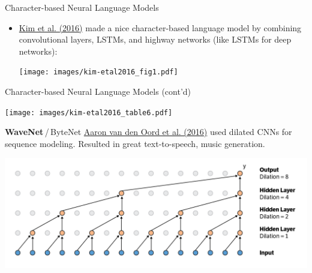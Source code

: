 \documentclass[xcolor=pdftex,x11names,table,hyperref]{beamer}
\newcommand{\conv}{convolutional}
\begin{document}
\begin{frame}{Character-based Neural Language Models}
\begin{itemize}
	\item \href{http://arxiv.org/abs/1508.06615}{Kim et al. (2016)} made a nice character-based language model by combining \conv{} layers, LSTMs, and highway networks (like LSTMs for deep networks): \\
	\begin{center}
	\texttt{[image: images/kim-etal2016\_fig1.pdf]}
	\end{center}
\end{itemize}
\end{frame}

\begin{frame}{Character-based Neural Language Models (cont'd)}
	\begin{center}
	\texttt{[image: images/kim-etal2016\_table6.pdf]}
	\end{center}
\end{frame}


\begin{frame}{\textbf{WaveNet}\,/\,ByteNet}
	\href{https://arxiv.org/abs/1609.03499}{Aaron van den Oord et al. (2016)} used dilated CNNs for sequence modeling. Resulted in great text-to-speech, music generation. \\
	\begin{center}
	\includegraphics[width=1.02\textwidth]{images/wavenet.png}
	\end{center}
\end{frame}
\end{document}
